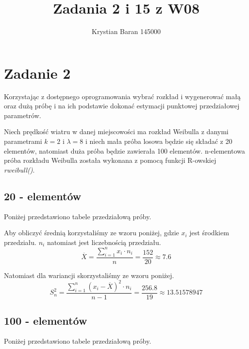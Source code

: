 \documentclass{article}
\author{Krystian Baran 145000}
\title{Zadania 2 i 15 z W08}
\begin{document}
\maketitle
\newpage

\tableofcontents
\newpage

\section{Zadanie 2}
Korzystając z dostępnego oprogramowania wybrać rozkład i wygenerować małą oraz dużą próbę i na ich podstawie dokonać estymacji punktowej przedziałowej parametrów. \\ \par

Niech prędkość wiatru w danej miejscowości ma rozkład Weibulla z danymi parametrami $k=2$ i $\lambda = 8$ i niech mała próba losowa będzie się składać z 20 elementów, natomiast duża próba będzie zawierała 100 elementów. n-elementowa próba rozkładu Weibulla została wykonana z pomocą funkcji R-owskiej \textit{rweibull()}.

\subsection{20 - elementów}
Poniżej przedstawiono tabele przedziałową próby.
\begin{center}
\end{center}

Aby obliczyć średnią korzystaliśmy ze wzoru poniżej, gdzie $x_i$ jest środkiem przedziału. $n_i$ natomiast jest liczebnością przedziału.
\[ \overline{X} = \frac{\sum_{i=1}^n x_i \cdot n_i}{n} = \frac{152}{20} \approx 7.6\]

Natomiast dla wariancji skorzystaliśmy ze wzoru poniżej.
\[ S^2_n = \frac{\sum_{i=1}^n(x_i-\overline{X})^2 \cdot n_i}{n-1} = \frac{256.8}{19} \approx 13.51578947 \]

\subsection{100 - elementów}
Poniżej przedstawiono tabele przedziałową próby.
\begin{center}
\end{center}
\end{document}
